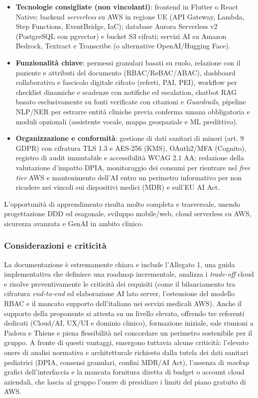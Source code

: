 \documentclass[11pt, a4paper]{article}
\begin{document}
\begin{itemize}
    \item \textbf{Tecnologie consigliate (non vincolanti)}: frontend in Flutter o React Native; backend \textit{serverless} su AWS in regione UE (API Gateway, Lambda, Step Functions, EventBridge, IaC); database Aurora Serverless v2 (PostgreSQL con pgvector) e bucket S3 cifrati; servizi AI su Amazon Bedrock, Textract e Transcribe (o alternative OpenAI/Hugging Face).
    \item \textbf{Funzionalità chiave}: permessi granulari basati su ruolo, relazione con il paziente e attributi del documento (RBAC/ReBAC/ABAC), dashboard collaborativa e fascicolo digitale cifrato (referti, PAI, PEI), workflow per checklist dinamiche e scadenze con notifiche ed escalation, chatbot RAG basato esclusivamente su fonti verificate con citazioni e \textit{Guardrails}, pipeline NLP/NER per estrarre entità cliniche previa conferma umana obbligatoria e moduli opzionali (assistente vocale, mappa geospaziale e ML predittivo).
    \item \textbf{Organizzazione e conformità}: gestione di dati sanitari di minori (art. 9 GDPR) con cifratura TLS 1.3 e AES-256 (KMS), OAuth2/MFA (Cognito), registro di audit immutabile e accessibilità WCAG 2.1 AA; redazione della valutazione d'impatto DPIA, monitoraggio dei consumi per rientrare nel \textit{free tier} AWS e mantenimento dell'AI entro un perimetro informativo per non ricadere nei vincoli sui dispositivi medici (MDR) e sull'EU AI Act.
\end{itemize} 

L'opportunità di apprendimento risulta molto completa e trasversale, unendo progettazione DDD ed esagonale, sviluppo mobile/web, cloud serverless su AWS, sicurezza avanzata e GenAI in ambito clinico.

\subsubsection{Considerazioni e criticità}
La documentazione è estremamente chiara e include l'Allegato 1, una guida implementativa che definisce una roadmap incrementale, analizza i \textit{trade-off} cloud e risolve preventivamente le criticità dei requisiti (come il bilanciamento tra cifratura \textit{end-to-end} ed elaborazione AI lato server, l'estensione del modello RBAC e il mancato supporto dell'italiano nei servizi medicali AWS). Anche il supporto della proponente si attesta su un livello elevato, offrendo tre referenti dedicati (Cloud/AI, UX/UI e dominio clinico), formazione iniziale, sale riunioni a Padova e Thiene e piena flessibilità nel concordare un perimetro sostenibile per il gruppo. \newline
A fronte di questi vantaggi, emergono tuttavia alcune criticità: l'elevato onere di analisi normativa e architetturale richiesto dalla tutela dei dati sanitari pediatrici (DPIA, consensi granulari, confini MDR/AI Act), l'assenza di \textit{mockup} grafici dell'interfaccia e la mancata fornitura diretta di budget o account cloud aziendali, che lascia al gruppo l'onere di presidiare i limiti del piano gratuito di AWS.
\end{document}
